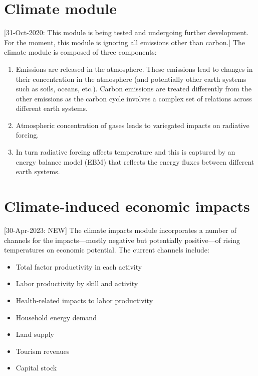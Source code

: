 \documentclass[11pt,letterpaper]{report}
\begin{document}
\section{Climate module}
\label{sec:climModule}

[31-Oct-2020: This module is being
tested and undergoing further development.
For the moment, this module is ignoring
all emissions other than carbon.]
The climate module is composed of three components:

\begin{enumerate}
\item Emissions are released in the atmosphere. These
emissions lead to changes in their concentration in
the atmosphere (and potentially other earth systems
such as soils, oceans, etc.). Carbon emissions are
treated differently from the other emissions as the
carbon cycle involves a complex set of relations across
different earth systems.
\item Atmospheric concentration of gases leads to
variegated impacts on radiative forcing.
\item In turn radiative forcing affects temperature
and this is captured by an energy balance model (EBM)
that reflects the energy fluxes between different earth
systems.
\end{enumerate}



\section{Climate-induced economic impacts}

[30-Apr-2023: NEW] The climate impacts module
incorporates a number of channels for the impacts---mostly
negative but potentially positive---of rising temperatures on economic potential.
The current channels include:

\begin{itemize}
\item {Total factor productivity in each activity}
\item {Labor productivity by skill and activity}
\item {Health-related impacts to labor productivity}
\item {Household energy demand}
\item {Land supply}
\item {Tourism revenues}
\item {Capital stock}
\end{itemize}
\end{document}
